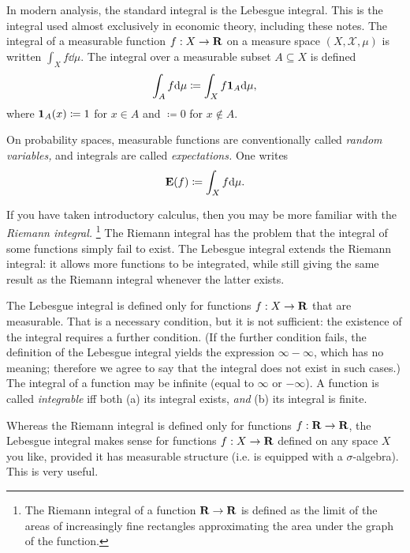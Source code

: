 \documentclass[11pt,letterpaper,reqno,oneside]{book}
\begin{document}
\begin{appendices}
In modern analysis, the standard integral is the Lebesgue integral.
This is the integral used almost exclusively in economic theory, including these notes.
The integral of a measurable function $f : X \to \mathbf{R}$ on a measure space $(X,\mathcal{X},\mu)$ is written $\int_X f \dd \mu$.
The integral over a measurable subset $A \subseteq X$ is defined
%
\begin{equation*}
	\int_A f \mathrm{d} \mu \coloneqq \int_X f \boldsymbol{1}_A \mathrm{d} \mu ,
\end{equation*}
%
where $\boldsymbol{1}_A(x) \coloneqq 1$ for $x \in A$ and $\coloneqq 0$ for $x \notin A$.

On probability spaces, measurable functions are conventionally called \emph{random variables,}
and integrals are called \emph{expectations.}
One writes
%
\begin{equation*}
	\mathbf{E}( f ) \coloneqq \int_X f \mathrm{d} \mu .
\end{equation*}

If you have taken introductory calculus, then you may be more familiar with the \emph{Riemann integral.}%
	\footnote{The Riemann integral of a function $\mathbf{R} \to \mathbf{R}$ is defined as the limit of the areas of increasingly fine rectangles approximating the area under the graph of the function.}
The Riemann integral has the problem that the integral of some functions simply fail to exist.
The Lebesgue integral extends the Riemann integral:
it allows more functions to be integrated,
while still giving the same result as the Riemann integral whenever the latter exists.

The Lebesgue integral is defined only for functions $f : X \to \mathbf{R}$ that are measurable.
That is a necessary condition, but it is not sufficient:
the existence of the integral requires a further condition.
(If the further condition fails, the definition of the Lebesgue integral yields the expression $\infty - \infty$, which has no meaning; therefore we agree to say that the integral does not exist in such cases.)
The integral of a function may be infinite (equal to $\infty$ or $-\infty$).
A function is called \emph{integrable} iff both (a) its integral exists, \emph{and} (b) its integral is finite.

Whereas the Riemann integral is defined only for functions $f : \mathbf{R} \to \mathbf{R}$,
the Lebesgue integral makes sense for functions $f : X \to \mathbf{R}$
defined on any space $X$ you like, provided it has measurable structure (i.e. is equipped with a $\sigma$-algebra).
This is very useful.



\end{appendices}
\end{document}
